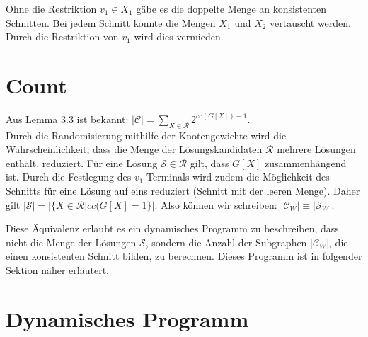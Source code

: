 Ohne die Restriktion $v_1 \in X_1$ gäbe es die doppelte Menge an konsistenten Schnitten. Bei jedem Schnitt könnte die Mengen $X_1$ und $X_2$ vertauscht werden. Durch die Restriktion von $v_1$ wird dies vermieden.


\section{Count}
\label{sec:st_count}
Aus Lemma 3.3 ist bekannt: $|\mathcal{C}|=\sum_{X \in \mathcal{R}} 2^{cc(G[X])-1}$. \\
Durch die Randomisierung mithilfe der Knotengewichte wird die Wahrscheinlichkeit, dass die Menge der Lösungskandidaten $\mathcal{R}$ mehrere Lösungen enthält, reduziert. 
Für eine Lösung $\mathcal{S} \in \mathcal{R}$ gilt, dass $G[X]$ zusammenhängend ist. 
Durch die Festlegung des $v_1$-Terminals wird zudem die Möglichkeit des Schnitts für eine Lösung auf eins reduziert (Schnitt mit der leeren Menge). 
Daher gilt $|\mathcal{S}| = |\{X \in \mathcal{R}| cc(G[X]=1\}|$.
Also können wir schreiben: $|\mathcal{C}_W| \equiv |\mathcal{S}_W|$.

Diese Äquivalenz erlaubt es ein dynamisches Programm zu beschreiben, dass nicht die Menge der Lösungen $\mathcal{S}$, sondern die Anzahl der Subgraphen $|\mathcal{C}_W|$, die einen konsistenten Schnitt bilden, zu berechnen. Dieses Programm ist in folgender Sektion näher erläutert.

\section{Dynamisches Programm}
\label{sec:dynP}

